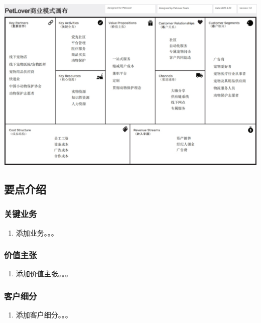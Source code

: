 \documentclass[a4paper]{ctexart}
\begin{document}
\begin{center}
  \includegraphics[width=16cm]{the-business-model-canvas}
\end{center}

\subsection{要点介绍}

\subsubsection{关键业务}

\begin{enumerate}[label=\alph*.]
  \item 添加业务。。。
\end{enumerate}

\subsubsection{价值主张}

\begin{enumerate}[label=\alph*.]
  \item 添加价值主张。。。
\end{enumerate}

\subsubsection{客户细分}

\begin{enumerate}[label=\alph*.]
  \item 添加客户细分。。。
\end{enumerate}
\end{document}
